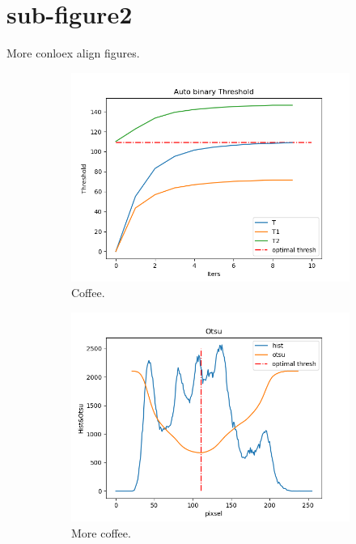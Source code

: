 \documentclass{article}
\begin{document}
\section{sub-figure2}
More conloex align figures.
\begin{figure}[h!]
  \centering
  \begin{subfigure}[b]{0.4\linewidth}
    \includegraphics[width=\linewidth]{autoThres.png}
     \caption{Coffee.}
  \end{subfigure}
  \begin{subfigure}[b]{0.4\linewidth}
    \includegraphics[width=\linewidth]{otsu.png}
    \caption{More coffee.}
  \end{subfigure}
  \begin{subfigure}[b]{0.4\linewidth}

\end{subfigure}
\end{figure}
\end{document}
